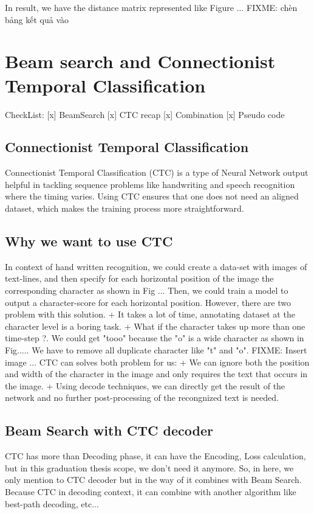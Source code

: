       In result, we have the distance matrix represented like Figure ...
      FIXME: chèn bảng kết quả vào
  
  \section{ Beam search and Connectionist Temporal Classification }
    CheckList:
      [x] BeamSearch
      [x] CTC recap
      [x] Combination
      [x] Pseudo code
      \subsection{ Connectionist Temporal Classification }
      Connectionist Temporal Classification (CTC) is a type of Neural Network output helpful
      in tackling sequence problems like handwriting and speech recognition where the timing varies.
      Using CTC ensures that one does not need an aligned dataset, which makes the training process
      more straightforward.
      \subsection{ Why we want to use CTC }
        In context of hand written recognition, we could create a data-set with
        images of text-lines, and then specify for each horizontal position of the image
        the corresponding character as shown in Fig ... Then, we could train a model to output
        a character-score for each horizontal position. However, there are two problem with this
        solution.
          + It takes a lot of time, annotating dataset at the character level is a boring task.
          + What if the character takes up more than one time-step ?. We could get "tooo" because
          the "o" is a wide character as shown in Fig..... We have to remove all duplicate character
          like "t" and "o".
          FIXME: Insert image ...
        CTC can solves both problem for us:
          + We can ignore both the position and width of the character in the image
          and only requires the text that occurs in the image.
          + Using decode techniques, we can directly get the result of the network and
          no further post-processing of the recongnized text is needed. 

    \subsection{ Beam Search with CTC decoder }
      CTC has more than Decoding phase, it can have the Encoding, Loss calculation, but in
      this graduation thesis scope, we don't need it anymore. So, in here, we only
      mention to CTC decoder but in the way of it combines with Beam Search. Because CTC
      in decoding context, it can combine with another algorithm like best-path decoding, etc...

